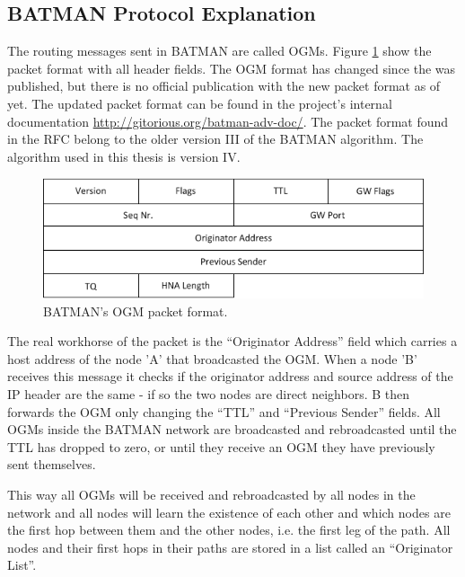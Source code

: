 \subsection{BATMAN Protocol Explanation}
The routing messages sent in BATMAN are called \acp{OGM}. Figure
\ref{fig:original_ogm} show the packet format with all header fields. The
\ac{OGM} format has changed since the \cite{batman_rfc} was published, but there
is no official publication with the new packet format as of yet. The updated
packet format can be found in the project's internal documentation
\url{http://gitorious.org/batman-adv-doc/}. The packet format found in the RFC
belong to the older version III of the BATMAN algorithm. The algorithm used in
this thesis is version IV.

\begin{figure}[h]
	\centering
  	\includegraphics[width=\textwidth]{images/original_ogm.png}
  	\caption{BATMAN's \acf{OGM} packet format.}
	\label{fig:original_ogm}
\end{figure}

The real workhorse of the packet is the ``Originator Address'' field which
carries a host address of the node 'A' that broadcasted the \ac{OGM}. When a
node 'B' receives this message it checks if the originator address and source
address of the IP header are the same - if so the two nodes are direct
neighbors. B then forwards the \ac{OGM} only changing the ``\ac{TTL}'' and
``Previous Sender'' fields. All \acp{OGM} inside the BATMAN network are
broadcasted and rebroadcasted until the TTL has dropped to zero, or until they
receive an \ac{OGM} they have previously sent themselves.

This way all \acp{OGM} will be received and rebroadcasted by all nodes in the
network and all nodes will learn the existence of each other and which nodes are
the first hop between them and the other nodes, i.e. the first leg of the path.
All nodes and their first hops in their paths are stored in a list called an
``Originator List''.

